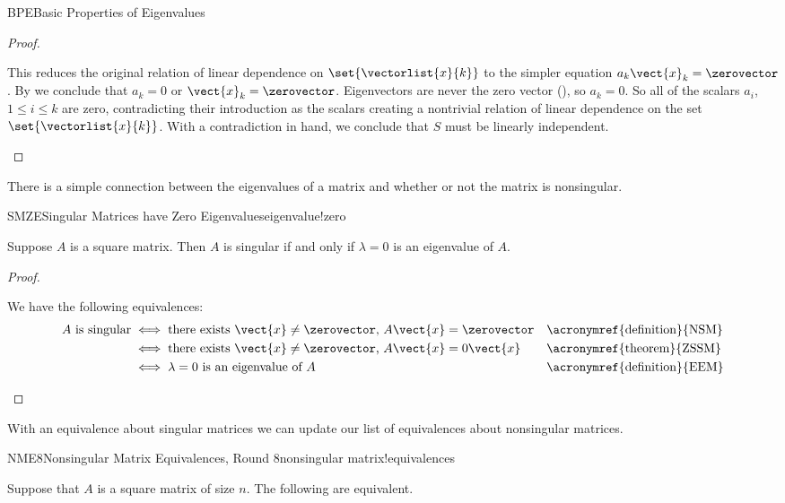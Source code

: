 \begin{subsect}{BPE}{Basic Properties of Eigenvalues}
\begin{proof}
%
\begin{para}This reduces the original relation of linear dependence on $\set{\vectorlist{x}{k}}$ to the simpler equation $a_k\vect{x}_k=\zerovector$.  By  we conclude that $a_k=0$ or $\vect{x}_k=\zerovector$.  Eigenvectors are never the zero vector (), so $a_k=0$.  So all of the scalars $a_i$, $1\leq i\leq k$ are zero, contradicting their introduction as the scalars creating a nontrivial relation of linear dependence on the set $\set{\vectorlist{x}{k}}$.  With a contradiction in hand, we conclude that $S$ must be linearly independent.\end{para}
%
\end{proof}
%
\begin{para}There is a simple connection between the eigenvalues of a matrix and whether or not the matrix is nonsingular.\end{para}
%
\begin{theorem}{SMZE}{Singular Matrices have Zero Eigenvalues}{eigenvalue!zero}
\begin{para}Suppose $A$ is a square matrix.  Then $A$ is singular if and only if $\lambda=0$ is an eigenvalue of $A$.\end{para}
\end{theorem}
%
\begin{proof}
\begin{para}We have the following equivalences:
%
\begin{align*}
\text{$A$ is singular}&\iff\text{there exists $\vect{x}\neq\zerovector$, $A\vect{x}=\zerovector$}&&\text{\acronymref{definition}{NSM}}\\
&\iff\text{there exists $\vect{x}\neq\zerovector$, $A\vect{x}=0\vect{x}$}&&\text{\acronymref{theorem}{ZSSM}}\\
&\iff\text{$\lambda=0$ is an eigenvalue of $A$}&&\text{\acronymref{definition}{EEM}}
%
\end{align*}
\end{para}
%
\end{proof}
%
\begin{para}With an equivalence about singular matrices we can update our list of equivalences about nonsingular matrices.\end{para}
%
\begin{theorem}{NME8}{Nonsingular Matrix Equivalences, Round 8}{nonsingular matrix!equivalences}
\begin{para}Suppose that $A$ is a square matrix of size $n$.  The following are equivalent.

\end{para}
\end{theorem}
\end{subsect}
